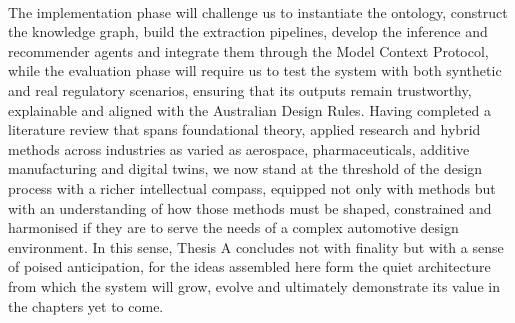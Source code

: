     \paragraph{} 
    The implementation phase will challenge us to instantiate the ontology, construct the knowledge graph, build the extraction pipelines, develop the inference and recommender agents and integrate them through the Model Context Protocol, while the evaluation phase will require us to test the system with both synthetic and real regulatory scenarios, ensuring that its outputs remain trustworthy, explainable and aligned with the Australian Design Rules. Having completed a literature review that spans foundational theory, applied research and hybrid methods across industries as varied as aerospace, pharmaceuticals, additive manufacturing and digital twins, we now stand at the threshold of the design process with a richer intellectual compass, equipped not only with methods but with an understanding of how those methods must be shaped, constrained and harmonised if they are to serve the needs of a complex automotive design environment. In this sense, Thesis A concludes not with finality but with a sense of poised anticipation, for the ideas assembled here form the quiet architecture from which the system will grow, evolve and ultimately demonstrate its value in the chapters yet to come.
